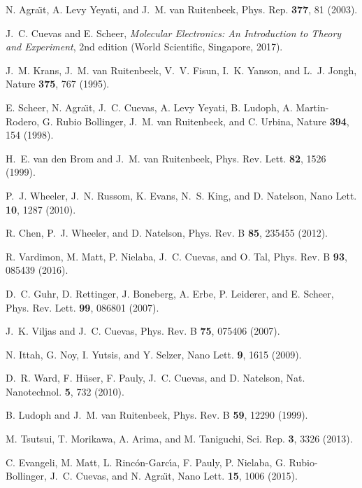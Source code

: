 \documentclass[aps,amsmath,amssymb,twocolumn,showpacs]{revtex4-1}
\begin{document}
\begin{thebibliography}{00}

N. Agra\"{\i}t, A. Levy Yeyati, and J.~M. van Ruitenbeek,
Phys. Rep. {\bf 377}, 81 (2003).

J.~C. Cuevas and E. Scheer, \emph{Molecular Electronics: An Introduction to Theory and Experiment}, 
2nd edition (World Scientific, Singapore, 2017).

J.~M. Krans, J.~M. van Ruitenbeek, V.~V. Fisun, I.~K. Yanson, and L.~J. Jongh,
Nature {\bf 375}, 767 (1995).

E. Scheer, N. Agra\"{\i}t, J.~C. Cuevas, A. Levy Yeyati, B. Ludoph, A.
Martin-Rodero, G. Rubio Bollinger, J.~M. van Ruitenbeek, and C. Urbina,
Nature {\bf 394}, 154 (1998).

H.~E. van den Brom and J.~M. van Ruitenbeek,
Phys. Rev. Lett. {\bf 82}, 1526 (1999).

P.~J. Wheeler, J.~N. Russom, K. Evans, N.~S. King, and D. Natelson,
Nano Lett. {\bf 10}, 1287 (2010).

R. Chen, P.~J. Wheeler, and D. Natelson,
Phys. Rev. B {\bf 85}, 235455 (2012).

R. Vardimon, M. Matt, P. Nielaba, J.~C. Cuevas, and O. Tal,
Phys. Rev. B {\bf 93}, 085439 (2016).

D.~C. Guhr, D. Rettinger, J. Boneberg, A. Erbe, P. Leiderer, and E. Scheer,
Phys. Rev. Lett. {\bf 99}, 086801 (2007).

J.~K. Viljas and J.~C. Cuevas, 
Phys. Rev. B {\bf 75}, 075406 (2007).

N. Ittah, G. Noy, I. Yutsis,  and Y. Selzer,
Nano Lett. {\bf 9}, 1615 (2009).

D.~R. Ward, F. H\"user, F. Pauly, J.~C. Cuevas, and D. Natelson,
Nat. Nanotechnol. {\bf 5}, 732 (2010).

B. Ludoph and J.~M. van Ruitenbeek,
Phys. Rev. B {\bf 59}, 12290 (1999).

M. Tsutsui, T. Morikawa, A. Arima, and M. Taniguchi,
Sci. Rep. {\bf 3}, 3326 (2013).

C. Evangeli, M. Matt, L. Rinc\'on-Garc\'{\i}a, F. Pauly, P. Nielaba, G. Rubio-Bollinger, 
J.~C. Cuevas, and N. Agra\"{\i}t,  
Nano Lett. {\bf 15}, 1006 (2015).


\end{thebibliography}
\end{document}
